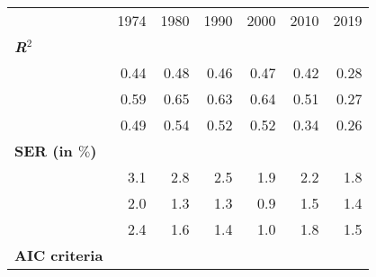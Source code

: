 \begin{tabular}{lllllll}
\cline{1-7}
\multicolumn{1}{c}{} &
  \multicolumn{1}{|r}{1974} &
  \multicolumn{1}{r}{1980} &
  \multicolumn{1}{r}{1990} &
  \multicolumn{1}{r}{2000} &
  \multicolumn{1}{r}{2010} &
  \multicolumn{1}{r}{2019} \\
\cline{1-7}
\multicolumn{1}{l}{\textbf{\textit{R}$^2$}} &
  \multicolumn{1}{|r}{} &
  \multicolumn{1}{r}{} &
  \multicolumn{1}{r}{} &
  \multicolumn{1}{r}{} &
  \multicolumn{1}{r}{} &
  \multicolumn{1}{r}{} \\
\multicolumn{1}{l}{\hspace{1em}{Model (A)}} &
  \multicolumn{1}{|r}{0.44} &
  \multicolumn{1}{r}{0.48} &
  \multicolumn{1}{r}{0.46} &
  \multicolumn{1}{r}{0.47} &
  \multicolumn{1}{r}{0.42} &
  \multicolumn{1}{r}{0.28} \\
\multicolumn{1}{l}{\hspace{1em}{Model (B)}} &
  \multicolumn{1}{|r}{0.59} &
  \multicolumn{1}{r}{0.65} &
  \multicolumn{1}{r}{0.63} &
  \multicolumn{1}{r}{0.64} &
  \multicolumn{1}{r}{0.51} &
  \multicolumn{1}{r}{0.27} \\
\multicolumn{1}{l}{\hspace{1em}{Model (C)}} &
  \multicolumn{1}{|r}{0.49} &
  \multicolumn{1}{r}{0.54} &
  \multicolumn{1}{r}{0.52} &
  \multicolumn{1}{r}{0.52} &
  \multicolumn{1}{r}{0.34} &
  \multicolumn{1}{r}{0.26} \\
\multicolumn{1}{l}{\textbf{SER (in $\%$)}} &
  \multicolumn{1}{|r}{} &
  \multicolumn{1}{r}{} &
  \multicolumn{1}{r}{} &
  \multicolumn{1}{r}{} &
  \multicolumn{1}{r}{} &
  \multicolumn{1}{r}{} \\
\multicolumn{1}{l}{\hspace{1em}{Model (A)}} &
  \multicolumn{1}{|r}{3.1} &
  \multicolumn{1}{r}{2.8} &
  \multicolumn{1}{r}{2.5} &
  \multicolumn{1}{r}{1.9} &
  \multicolumn{1}{r}{2.2} &
  \multicolumn{1}{r}{1.8} \\
\multicolumn{1}{l}{\hspace{1em}{Model (B)}} &
  \multicolumn{1}{|r}{2.0} &
  \multicolumn{1}{r}{1.3} &
  \multicolumn{1}{r}{1.3} &
  \multicolumn{1}{r}{0.9} &
  \multicolumn{1}{r}{1.5} &
  \multicolumn{1}{r}{1.4} \\
\multicolumn{1}{l}{\hspace{1em}{Model (C)}} &
  \multicolumn{1}{|r}{2.4} &
  \multicolumn{1}{r}{1.6} &
  \multicolumn{1}{r}{1.4} &
  \multicolumn{1}{r}{1.0} &
  \multicolumn{1}{r}{1.8} &
  \multicolumn{1}{r}{1.5} \\
\multicolumn{1}{l}{\textbf{AIC criteria}} &

\end{tabular}
